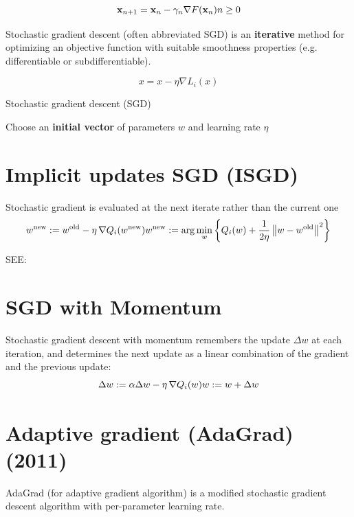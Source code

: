 \[
    \displaystyle \mathbf {x} _{n+1}=\mathbf {x} _{n}-\gamma _{n}\nabla F(\mathbf {x} _{n}) \hfill n\geq 0
\]


Stochastic gradient descent (often abbreviated SGD) is an \textbf{iterative} method for optimizing an objective function with suitable smoothness properties (e.g. differentiable or subdifferentiable).

\[
    \displaystyle x = x - \eta\nabla L_{i}(x)
\]

\begin{algorithm}
    \caption{Stochastic gradient descent (SGD)}
    
    Choose an \textbf{initial vector} of parameters ${\displaystyle w}$ and learning rate ${\displaystyle \eta }$

\end{algorithm}


\section{Implicit updates SGD (ISGD)}\label{Implicit updates SGD (ISGD)}
Stochastic gradient is evaluated at the next iterate rather than the current one
\[
    {\displaystyle w^{\text{new}}:=w^{\text{old}}-\eta \,\nabla Q_{i}(w^{\rm {new}})} 
    \hfill 
    {\displaystyle w^{\text{new}}:=\arg \min _{w}\dCurlyBrac{Q_{i}(w)+{\frac {1}{2\eta }}\left\|w-w^{\text{old}}\right\|^{2}}}
\]

SEE: 

\section{SGD with Momentum \cite{wiki-Stochastic_gradient_descent}}\label{SGD with Momentum}
Stochastic gradient descent with momentum remembers the update $\Delta w$ at each iteration, and determines the next update as a linear combination of the gradient and the previous update:
\[
    {\displaystyle \Delta w:=\alpha \Delta w-\eta \,\nabla Q_{i}(w)}
    \hfill
    {\displaystyle w:=w+\Delta w}
\]

\section{Adaptive gradient (AdaGrad) (2011) \cite{wiki-Stochastic_gradient_descent}}\label{Adaptive gradient (AdaGrad)}
AdaGrad (for adaptive gradient algorithm) is a modified stochastic gradient descent algorithm with per-parameter learning rate.

